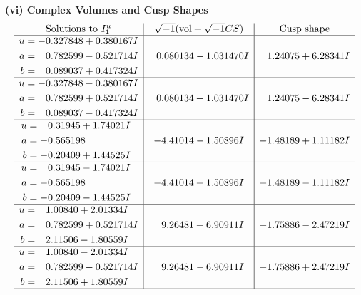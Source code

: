 \documentclass[1p]{elsarticle_modified}
\theoremstyle{definition}
\newcommand{\I}{\sqrt{-1}}
\begin{document}
\newpage\flushleft \textbf{(vi) Complex Volumes and Cusp Shapes}
$$\begin{array}{c|c|c}  
\text{Solutions to }I^u_{1}& \I (\text{vol} + \sqrt{-1}CS) & \text{Cusp shape}\\
 \hline 
\begin{aligned}
u &= -0.327848 + 0.380167 I \\
a &= \phantom{-}0.782599 - 0.521714 I \\
b &= \phantom{-}0.089037 + 0.417324 I\end{aligned}
 & \phantom{-}0.080134 - 1.031470 I & \phantom{-}1.24075 + 6.28341 I \\ \hline\begin{aligned}
u &= -0.327848 - 0.380167 I \\
a &= \phantom{-}0.782599 + 0.521714 I \\
b &= \phantom{-}0.089037 - 0.417324 I\end{aligned}
 & \phantom{-}0.080134 + 1.031470 I & \phantom{-}1.24075 - 6.28341 I \\ \hline\begin{aligned}
u &= \phantom{-}0.31945 + 1.74021 I \\
a &= -0.565198\phantom{ +0.000000I} \\
b &= -0.20409 + 1.44525 I\end{aligned}
 & -4.41014 - 1.50896 I & -1.48189 + 1.11182 I \\ \hline\begin{aligned}
u &= \phantom{-}0.31945 - 1.74021 I \\
a &= -0.565198\phantom{ +0.000000I} \\
b &= -0.20409 - 1.44525 I\end{aligned}
 & -4.41014 + 1.50896 I & -1.48189 - 1.11182 I \\ \hline\begin{aligned}
u &= \phantom{-}1.00840 + 2.01334 I \\
a &= \phantom{-}0.782599 + 0.521714 I \\
b &= \phantom{-}2.11506 - 1.80559 I\end{aligned}
 & \phantom{-}9.26481 + 6.90911 I & -1.75886 - 2.47219 I \\ \hline\begin{aligned}
u &= \phantom{-}1.00840 - 2.01334 I \\
a &= \phantom{-}0.782599 - 0.521714 I \\
b &= \phantom{-}2.11506 + 1.80559 I\end{aligned}
 & \phantom{-}9.26481 - 6.90911 I & -1.75886 + 2.47219 I\\
 \hline 
 \end{array}$$\newpage\newpage\renewcommand{\arraystretch}{1}
\end{document}
